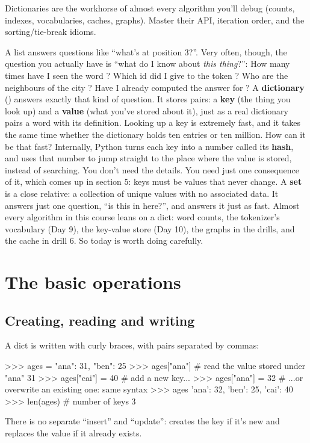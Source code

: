 \documentclass[10pt,a4paper]{article}
\begin{document}
\makecover
\setcounter{page}{2}
\makefrontmatter
\begin{goalbox}
Dictionaries are the workhorse of almost every algorithm you’ll debug (counts, indexes, vocabularies, caches, graphs). Master their API, iteration order, and the sorting/tie-break idioms.
\end{goalbox}
\vspace{2pt}
A list answers questions like “what’s at position 3?”. Very often, though, the question you actually have is “what do I know about \emph{this thing}?”: How many times have I seen the word ? Which id did I give to the token ? Who are the neighbours of the city ? Have I already computed the answer for ?
A \textbf{dictionary} () answers exactly that kind of question. It stores pairs: a \textbf{key} (the thing you look up) and a \textbf{value} (what you’ve stored about it), just as a real dictionary pairs a word with its definition. Looking up a key is extremely fast, and it takes the same time whether the dictionary holds ten entries or ten million.
How can it be that fast? Internally, Python turns each key into a number called its \textbf{hash}, and uses that number to jump straight to the place where the value is stored, instead of searching. You don’t need the details. You need just one consequence of it, which comes up in section 5: keys must be values that never change.
A \textbf{set} is a close relative: a collection of unique values with no associated data. It answers just one question, “is this in here?”, and answers it just as fast.
Almost every algorithm in this course leans on a dict: word counts, the tokenizer’s vocabulary (Day 9), the key-value store (Day 10), the graphs in the drills, and the cache in drill 6. So today is worth doing carefully.
\setcounter{section}{0}
\section{The basic operations}
\subsection{Creating, reading and writing}
A dict is written with curly braces, with  pairs separated by commas:
\begin{txtcode}
>>> ages = {"ana": 31, "ben": 25}
>>> ages["ana"]              # read the value stored under "ana"
31
>>> ages["cai"] = 40         # add a new key...
>>> ages["ana"] = 32         # ...or overwrite an existing one: same syntax
>>> ages
{'ana': 32, 'ben': 25, 'cai': 40}
>>> len(ages)                # number of keys
3
\end{txtcode}
There is no separate “insert” and “update”:  creates the key if it’s new and replaces the value if it already exists.
\end{document}
